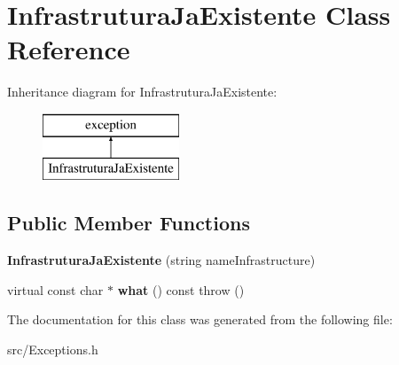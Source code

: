 \hypertarget{class_infrastrutura_ja_existente}{}\section{Infrastrutura\+Ja\+Existente Class Reference}
\label{class_infrastrutura_ja_existente}
Inheritance diagram for Infrastrutura\+Ja\+Existente\+:\begin{figure}[H]
\begin{center}
\leavevmode
\includegraphics[height=2.000000cm]{class_infrastrutura_ja_existente}
\end{center}
\end{figure}
\subsection*{Public Member Functions}
\begin{DoxyCompactItemize}
\item 
\hypertarget{class_infrastrutura_ja_existente_aad900d6748672e39d934533d3734d6b9}{}{\bfseries Infrastrutura\+Ja\+Existente} (string name\+Infrastructure)\label{class_infrastrutura_ja_existente_aad900d6748672e39d934533d3734d6b9}

\item 
\hypertarget{class_infrastrutura_ja_existente_adbce6cb377f4d2b2ee5c0437ff489ebe}{}virtual const char $\ast$ {\bfseries what} () const   throw ()\label{class_infrastrutura_ja_existente_adbce6cb377f4d2b2ee5c0437ff489ebe}

\end{DoxyCompactItemize}


The documentation for this class was generated from the following file\+:\begin{DoxyCompactItemize}
\item 
src/Exceptions.\+h\end{DoxyCompactItemize}
